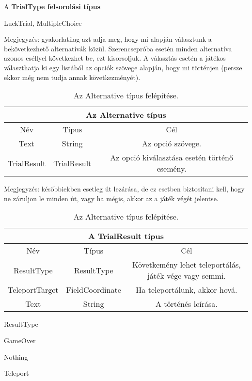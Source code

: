 A \textbf{TrialType felsorolási típus}
\begin{compactitem}
	\item LuckTrial, MultipleChoice
	\item Megjegyzés: gyakorlatilag azt adja meg, hogy mi alapján választunk a bekövetkezhető alternatívák közül. Szerencsepróba esetén minden alternatíva azonos eséllyel következhet be, ezt kisorsoljuk. A választás esetén a játékos választhatja ki egy listából az opciók szövege alapján, hogy mi történjen (persze ekkor még nem tudja annak következményét).
\end{compactitem}


\begin{table}[H]
	\centering
	\begin{tabular}{ |c|c|c| }
		\hline
		\multicolumn{3}{|c|}{Az Alternative típus}\\
		\hline
		Név & Típus & Cél \\
		\hline
		Text  & String  & Az opció szövege.  \\
		\hline
		TrialResult & TrialResult & Az opció kiválasztása esetén történő esemény.\\
		\hline
	\end{tabular}
	\caption[Alternative típus]{Az Alternative típus felépítése.}
	\label{tab:alternative}
\end{table}

Megjegyzés: későbbiekben esetleg út lezárása, de ez esetben biztosítani kell, hogy ne záruljon le minden út, vagy ha mégis, akkor az a játék végét jelentse.

\begin{table}[H]
	\centering
	\begin{tabular}{ |c|c|c| }
		\hline
		\multicolumn{3}{|c|}{A TrialResult típus}\\
		\hline
		Név & Típus & Cél \\
		\hline
		ResultType  & ResultType  & Követkemény lehet teleportálás, játék vége vagy semmi. \\
		\hline
		TeleportTarget & FieldCoordinate & Ha teleportálunk, akkor hová.\\
		\hline
		Text & String & A történés leírása. \\
		\hline
	\end{tabular}
	\caption[Alternative típus]{Az Alternative típus felépítése.}
	\label{tab:alternative}
\end{table}

ResultType
\begin{compactitem}
	\item GameOver
	\item Nothing
	\item Teleport
\end{compactitem}


